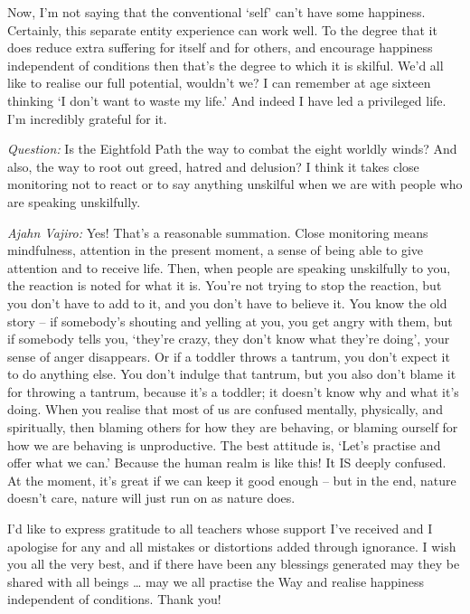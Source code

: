 Now, I'm not saying that the conventional `self' can't have some happiness. Certainly, this
separate entity experience can work well. To the degree that it does
reduce extra suffering for itself and for others, and encourage happiness independent of conditions then that's the degree to which it
is skilful. We'd all like to realise our full potential,
wouldn't we? I can remember at age sixteen thinking `I don't want to waste my
life.' And indeed I have led a privileged life. I'm incredibly grateful for it.

\bigskip

\emph{Question:} Is the Eightfold Path the way to combat the eight worldly winds? And
also, the way to root out greed, hatred and delusion? I think it takes close
monitoring not to react or to say anything unskilful when we are with people who
are speaking unskilfully.

\emph{Ajahn Vajiro:} Yes! That's a reasonable summation. Close monitoring means
mindfulness, attention in the present moment, a sense of being able to give
attention and to receive life. Then, when people are speaking unskilfully to
you, the reaction is noted for what it is. You're not trying to stop the
reaction, but you don't have to add to it, and you don't have to believe it. You
know the old story -- if somebody's shouting and yelling at you, you get angry
with them, but if somebody tells you, `they're crazy, they don't know what
they're doing', your sense of anger disappears. Or if a toddler throws a
tantrum, you don't expect it to do anything else. You don't indulge that
tantrum, but you also don't blame it for throwing a tantrum, because it's a
toddler; it doesn't know why and what it's doing. When you realise that most of
us are confused mentally, physically, and spiritually, then blaming others for
how they are behaving, or blaming ourself for how we are behaving is
unproductive. The best attitude is, `Let's practise and offer what we can.'
Because the human realm is like this! It IS deeply confused. At the moment, it's
great if we can keep it good enough -- but in the end, nature doesn't care,
nature will just run on as nature does.

I'd like to express gratitude to all teachers whose support I've received and I apologise for any and all mistakes or distortions added through ignorance.
I wish you all the very best, and if there have been any blessings generated
may they be shared with all beings \ldots{} may we all practise the Way and
realise happiness independent of conditions. Thank you!

